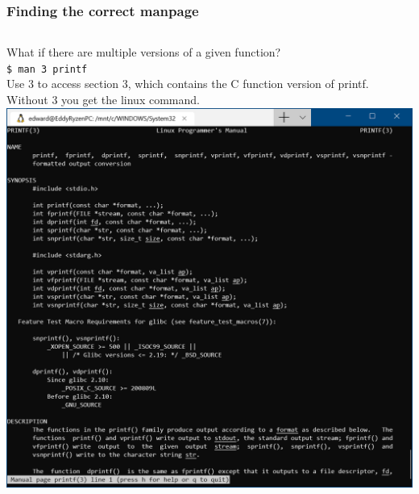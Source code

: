 \documentclass{beamer}
\begin{document}
\begin{frame}
  \frametitle{Finding the correct manpage}
  \begin{columns}[c]
      What if there are multiple versions of a given function?\\
      \texttt{\$ man 3 printf}\\
      Use 3 to access section 3, which contains the C function version of printf. Without 3 you get the linux command.
      \includegraphics[width=\textwidth,height=\textheight,keepaspectratio]{manprintf.png}
  \end{columns}
\end{frame}
\end{document}

